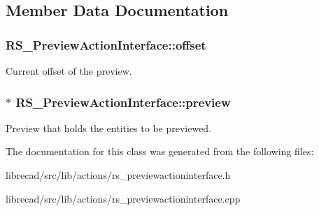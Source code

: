 \subsection{Member Data Documentation}
\hypertarget{classRS__PreviewActionInterface_ac067e0e61fa1375a4e10868be94cacb8}{
\subsubsection[{offset}]{ R\-S\-\_\-\-Preview\-Action\-Interface\-::offset\hspace{0.3cm}{\ttfamily [protected]}}}\label{classRS__PreviewActionInterface_ac067e0e61fa1375a4e10868be94cacb8}
Current offset of the preview. \hypertarget{classRS__PreviewActionInterface_ad678416870a4ad243bdbd09aebe12739}{
\subsubsection[{preview}]{$\ast$ R\-S\-\_\-\-Preview\-Action\-Interface\-::preview\hspace{0.3cm}{\ttfamily [protected]}}}\label{classRS__PreviewActionInterface_ad678416870a4ad243bdbd09aebe12739}
Preview that holds the entities to be previewed. 

The documentation for this class was generated from the following files\-:\begin{DoxyCompactItemize}
\item 
librecad/src/lib/actions/rs\-\_\-previewactioninterface.\-h\item 
librecad/src/lib/actions/rs\-\_\-previewactioninterface.\-cpp\end{DoxyCompactItemize}
